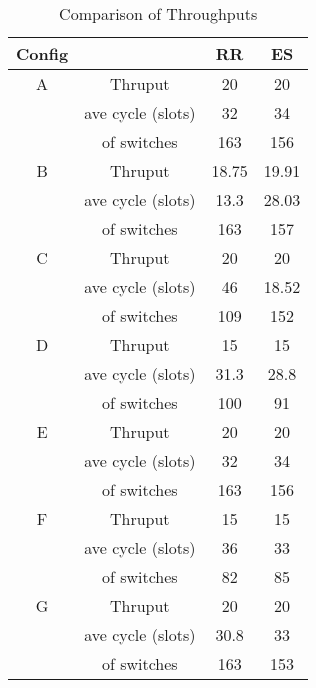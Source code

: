 \documentclass[12 pt]{article}
\newcommand{\debug}[1]{\mbox{\tt #1}}
\renewcommand{\debug}[1]{}              \newcommand{\cmd}[1]{}
\begin{document}
\begin{table}[hbtp]
\begin{center}
\begin{tabular}{|c|c|c|c|}
  \hline
Config  &                     & RR        & ES        \\ \hline
  A & Thruput                      & 20        & 20        \\ \cline{2-4}
    & ave cycle (slots)             & 32        & 34        \\ \cline{2-4}
    &  of switches             & 163       & 156        \\ \hline
  B & Thruput                      & 18.75     & 19.91      \\ \cline{2-4}
    & ave cycle (slots)             & 13.3      & 28.03      \\ \cline{2-4}
    &  of switches              & 163       & 157        \\  \hline
  C & Thruput                    & 20        & 20         \\ \cline{2-4}
    & ave cycle (slots)          & 46        & 18.52      \\ \cline{2-4}
    &  of switches           & 109       & 152        \\  \hline
  D & Thruput                       & 15        & 15        \\ \cline{2-4}
    & ave cycle (slots)          & 31.3      & 28.8      \\ \cline{2-4}
    &  of switches                & 100       & 91        \\  \hline
  E & Thruput                      & 20        & 20      \\ \cline{2-4}
    & ave cycle (slots)           & 32        & 34      \\ \cline{2-4}
    &  of switches              & 163       & 156        \\  \hline
  F & Thruput                     & 15        & 15      \\ \cline{2-4}
    & ave cycle (slots)          & 36        & 33      \\ \cline{2-4}
    &  of switches            & 82        & 85        \\  \hline
  G & Thruput                     & 20        & 20      \\ \cline{2-4}
    & ave cycle (slots)          & 30.8      & 33      \\ \cline{2-4}
    &  of switches            & 163       & 153        \\  \hline
\end{tabular}
\caption{Comparison of Throughputs\debug{\fbox{Table-Results}}\label{Table-Results}}
\end{center}
\end{table}
\end{document}
